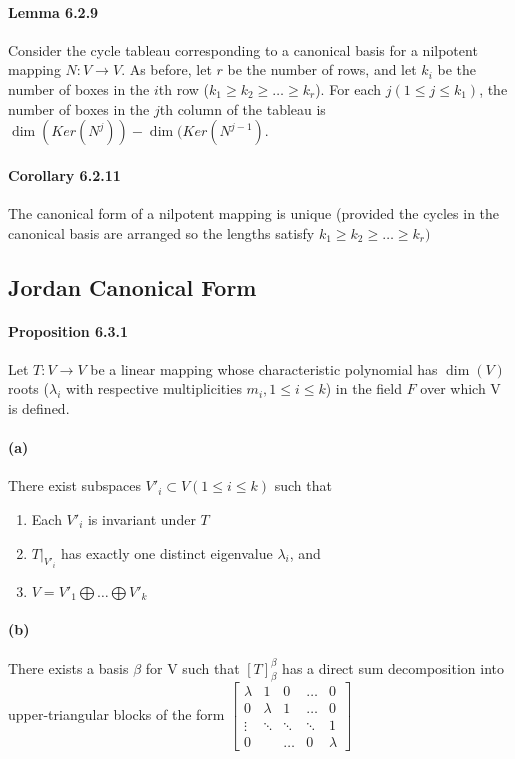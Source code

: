 \documentclass[11pt]{article}
\begin{document}
{\paragraph{Lemma 6.2.9} Consider the cycle tableau corresponding to a canonical basis for a nilpotent mapping $N: V \rightarrow V$. As before, let $r$ be the number of rows, and let $k_i$ be the number of boxes in the $i$th row ($k_1\geq k_2 \geq \hdots \geq k_r$). For each $j ( 1\leq j \leq k_1)$, the number of boxes in the $j$th column of the tableau is $\dim(Ker(N^j)) - \dim(Ker(N^{j-1})$. 
\paragraph{Corollary 6.2.11} The canonical form of a nilpotent mapping is unique (provided the cycles in the canonical basis are arranged so the lengths satisfy $k_1 \geq k_2 \geq \hdots \geq k_r)$
\subsection{Jordan Canonical Form}

\paragraph{Proposition 6.3.1} Let $T: V \rightarrow V$ be a linear mapping whose characteristic polynomial has $\dim(V)$ roots ($\lambda_i$ with respective multiplicities $m_i, 1 \leq i\leq k$) in the field $F$ over which V is defined.
\paragraph{(a)}There exist subspaces $V'_i\subset V (1\leq i \leq k)$ such that
\begin{enumerate}
	\item Each $V'_i$ is invariant under $T$
	\item $T|_{V'_i}$ has exactly one distinct eigenvalue $\lambda_i$, and
	\item $V = V'_1 \bigoplus \hdots \bigoplus V'_k$
\end{enumerate}
\paragraph{(b)} There exists a basis $\beta$ for V such that $[T]_\beta^\beta$ has a direct sum decomposition into upper-triangular blocks of the form 	$\begin{bmatrix}
		\lambda &1&0&\hdots&0\\
		0&\lambda&1&\hdots&0\\
		\vdots & \ddots&\ddots&\ddots&1\\
		0&&\hdots&0&\lambda
	\end{bmatrix}$
}
\end{document}

